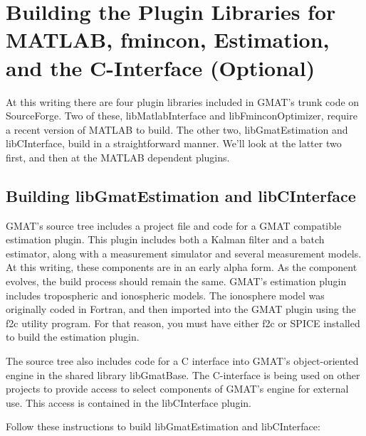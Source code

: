 \documentclass[letterpaper,10pt]{article}%
\begin{document}
\section{Building the Plugin Libraries for MATLAB, fmincon, Estimation, and the C-Interface (Optional)}

At this writing there are four plugin libraries included in GMAT's trunk code on SourceForge.  Two of these, libMatlabInterface and libFminconOptimizer, require a recent version of MATLAB to build.  The other two, libGmatEstimation and libCInterface, build in a straightforward manner.  We'll look at the latter two first, and then at the MATLAB dependent plugins.

\subsection{Building libGmatEstimation and libCInterface}

GMAT's source tree includes a project file and code for a GMAT compatible estimation plugin.  This plugin includes both a Kalman filter and a batch estimator, along with a measurement simulator and several measurement models.  At this writing, these components are in an early alpha form.  As the component evolves, the build process should remain the same.  GMAT's estimation plugin includes tropospheric and ionospheric models.  The ionosphere model was originally coded in Fortran, and then imported into the GMAT plugin using the f2c utility program.  For that reason, you must have either f2c or SPICE installed to build the estimation plugin.

The source tree also includes code for a C interface into GMAT's object-oriented engine in the shared library libGmatBase.  The C-interface is being used on other projects to provide access to select components of GMAT's engine for external use.  This access is contained in the libCInterface plugin.

Follow these instructions to build libGmatEstimation and libCInterface:
\end{document}
